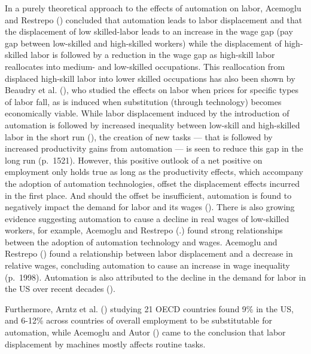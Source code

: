 \documentclass[
  12pt,
  a4paperpaper,
]{article}
\begin{document}
In a purely theoretical approach to the effects of automation on labor,
Acemoglu and Restrepo () concluded that automation leads to labor displacement and
that the displacement of low skilled-labor leads to an increase in the
wage gap (pay gap between low-skilled and high-skilled workers) while
the displacement of high-skilled labor is followed by a reduction in the
wage gap as high-skill labor reallocates into medium- and low-skilled
occupations. This reallocation from displaced high-skill labor into
lower skilled occupations has also been shown by Beaudry et al.
(), who studied the
effects on labor when prices for specific types of labor fall, as is
induced when substitution (through technology) becomes economically
viable. While labor displacement induced by the introduction of
automation is followed by increased inequality between low-skill and
high-skilled labor in the short run
(), the creation of new tasks --- that is followed by increased
productivity gains from automation --- is seen to reduce this gap in the
long run (p.~1521). However, this positive outlook of a net positive on
employment only holds true as long as the productivity effects, which
accompany the adoption of automation technologies, offset the
displacement effects incurred in the first place. And should the offset
be insufficient, automation is found to negatively impact the demand for
labor and its wages (). There is also growing evidence suggesting
automation to cause a decline in real wages of low-skilled workers, for
example, Acemoglu and Restrepo
(.) found strong
relationships between the adoption of automation technology and wages.
Acemoglu and Restrepo () found a relationship between labor displacement and a decrease in
relative wages, concluding automation to cause an increase in wage
inequality (p.~1998). Automation is also attributed to the decline in
the demand for labor in the US over recent decades
().

Furthermore, Arntz et al. ()
studying 21 OECD countries found 9\% in the US, and 6-12\% across
countries of overall employment to be substitutable for automation,
while Acemoglu and Autor () came to the conclusion that labor displacement by machines mostly
affects routine tasks.
\end{document}
